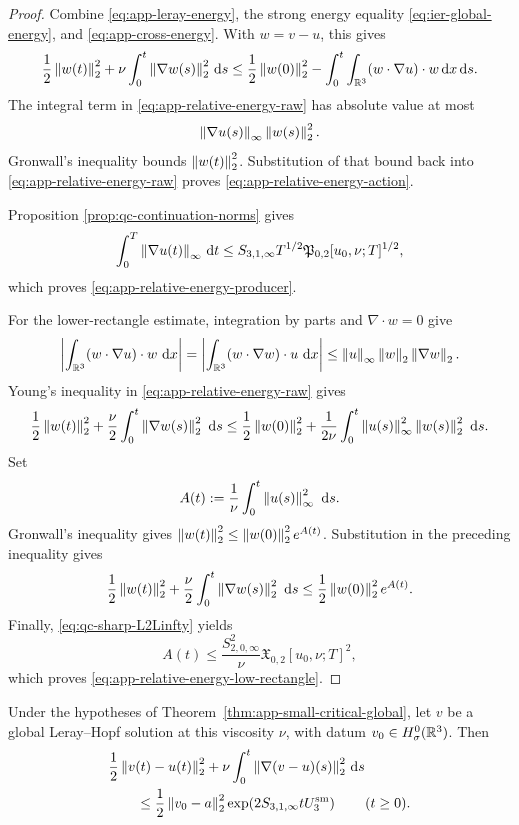 \begin{proof}
Combine \eqref{eq:app-leray-energy}, the strong energy equality
\eqref{eq:ier-global-energy}, and \eqref{eq:app-cross-energy}.  With
\(w=v-u\), this gives
\begin{equation}
 \frac12\left\lVert w(t)\right\rVert_2^2
 +\nu\int_0^t\left\lVert \nabla w(s)\right\rVert_2^2\,\mathrm d s
 \le
 \frac12\left\lVert w(0)\right\rVert_2^2
 -\int_0^t\int_{\mathbb R^3}(w\cdot\nabla u)\cdot w\,\mathrm d x\,\mathrm d s.
 \label{eq:app-relative-energy-raw}
\end{equation}
The integral term in \eqref{eq:app-relative-energy-raw} has absolute value at
most
\[
 \left\lVert \nabla u(s)\right\rVert_\infty\left\lVert w(s)\right\rVert_2^2.
\]
Gronwall's inequality bounds \(\left\lVert w(t)\right\rVert_2^2\).  Substitution of that
bound back into \eqref{eq:app-relative-energy-raw} proves
\eqref{eq:app-relative-energy-action}.
\begin{samepage}
Proposition
\ref{prop:qc-continuation-norms} gives
\[
 \int_0^T\left\lVert \nabla u(t)\right\rVert_\infty\,\mathrm d t
 \le
 S_{3,1,\infty}T^{1/2}
 \mathfrak P_{0,2}[u_0,\nu;T]^{1/2},
\]
which proves \eqref{eq:app-relative-energy-producer}.
\end{samepage}

For the lower-rectangle estimate, integration by parts and
\(\nabla\cdot w=0\) give
\[
 \left|\int_{\mathbb R^3}(w\cdot\nabla u)\cdot w\,\,\mathrm d x\right|
 =\left|\int_{\mathbb R^3}(w\cdot\nabla w)\cdot u\,\,\mathrm d x\right|
 \le\left\lVert u\right\rVert_\infty\left\lVert w\right\rVert_2\left\lVert \nabla w\right\rVert_2.
\]
Young's inequality in \eqref{eq:app-relative-energy-raw} gives
\begin{align*}
 \frac12\left\lVert w(t)\right\rVert_2^2
 +\frac\nu2\int_0^t\left\lVert \nabla w(s)\right\rVert_2^2\,\,\mathrm d s
 \le\frac12\left\lVert w(0)\right\rVert_2^2
 +\frac1{2\nu}\int_0^t\left\lVert u(s)\right\rVert_\infty^2
 \left\lVert w(s)\right\rVert_2^2\,\,\mathrm d s.
\end{align*}
Set
\[
 A(t):=\frac1\nu\int_0^t\left\lVert u(s)\right\rVert_\infty^2\,\,\mathrm d s.
\]
Gronwall's inequality gives
\(\left\lVert w(t)\right\rVert_2^2\le\left\lVert w(0)\right\rVert_2^2e^{A(t)}\).  Substitution in the
preceding inequality gives
\[
 \frac12\left\lVert w(t)\right\rVert_2^2
 +\frac\nu2\int_0^t\left\lVert \nabla w(s)\right\rVert_2^2\,\,\mathrm d s
 \le\frac12\left\lVert w(0)\right\rVert_2^2e^{A(t)}.
\]
Finally, \eqref{eq:qc-sharp-L2Linfty} yields
\[
 A(t)\le\frac{S_{2,0,\infty}^2}{\nu}
 \mathfrak X_{0,2}[u_0,\nu;T]^2,
\]
which proves \eqref{eq:app-relative-energy-low-rectangle}.
\end{proof}

\begin{corollary}
\label{cor:app-small-weak-stability}
Under the hypotheses of Theorem~\ref{thm:app-small-critical-global}, let
\(v\) be a global Leray--Hopf solution at this viscosity \(\nu\), with
datum \(v_0\in H^0_\sigma(\mathbb R^3)\).
Then
\begin{align}
 &\frac12\left\lVert v(t)-u(t)\right\rVert_2^2
 +\nu\int_0^t\left\lVert \nabla(v-u)(s)\right\rVert_2^2\,\mathrm d s
 \notag\\
 &\qquad\le
 \frac12\left\lVert v_0-a\right\rVert_2^2
 \exp\!\left(2S_{3,1,\infty}tU_3^{\rm sm}\right)
 \qquad(t\ge0).
 \label{eq:app-small-weak-stability}
\end{align}
\end{corollary}

